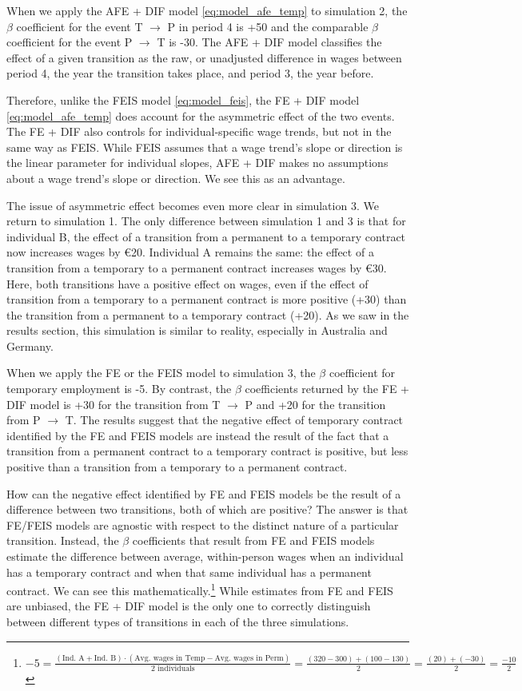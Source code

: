 When we apply the AFE + DIF model \ref{eq:model_afe_temp} to simulation 2, the $\beta$ coefficient for the event T $\rightarrow$ P in period 4 is +50 and the comparable $\beta$ coefficient for the event P $\rightarrow$ T is -30.  The AFE + DIF model classifies the effect of a given transition as the raw, or unadjusted difference in wages between period 4, the year the transition takes place, and period 3, the year before.   

Therefore, unlike the FEIS model \ref{eq:model_feis}, the FE + DIF model  \ref{eq:model_afe_temp} does account for the asymmetric effect of the two events.  The FE + DIF also controls for individual-specific wage trends, but not in the same way as FEIS.  While FEIS assumes that a wage trend's slope or direction is the linear parameter for individual slopes, AFE + DIF makes no assumptions about a wage trend's slope or direction.  We see this as an advantage.  

The issue of asymmetric effect becomes even more clear in simulation 3. We return to simulation 1.  The only difference between simulation 1 and 3 is that for individual B, the effect of a transition from a permanent to a temporary contract now increases wages by €20.  Individual A remains the same: the effect of a transition from a temporary to a permanent contract increases wages by €30.  Here, both transitions have a positive effect on wages, even if the effect of transition from a temporary to a permanent contract is more positive (+30) than the transition from a permanent to a temporary contract (+20).  As we saw in the results section, this simulation is similar to reality, especially in Australia and Germany.  

When we apply the FE or the FEIS model to simulation 3, the $\beta$ coefficient for temporary employment is -5.  By contrast, the $\beta$ coefficients returned by the FE + DIF model is +30 for the transition from T  $\rightarrow$ P and +20 for the transition from P  $\rightarrow$ T.  The results suggest that the negative effect of temporary contract identified by the FE and FEIS models are instead the result of the fact that a transition from a permanent contract to a temporary contract is positive, but less positive than a transition from a temporary to a permanent contract.  

How can the negative effect identified by FE and FEIS models be the result of a difference between two transitions, both of which are positive?  The answer is that FE/FEIS models are agnostic with respect to the distinct nature of a particular transition.  Instead, the $\beta$ coefficients that result from FE and FEIS models estimate the difference between average, within-person wages when an individual has a temporary contract and when that same individual has a permanent contract.  We can see this mathematically.\footnote{$-5 = \frac{(\text{Ind. A} + \text{Ind. B}) \cdot (\text{Avg. wages in Temp} - \text{Avg. wages in Perm})}{2 \text{ individuals}} = \frac{(320-300) + (100-130)}{2} = \frac{(20) + (-30)}{2} = \frac{-10}{2}$}   While estimates from FE and FEIS are unbiased, the FE + DIF model is the only one to correctly distinguish between different types of transitions in each of the three simulations.

